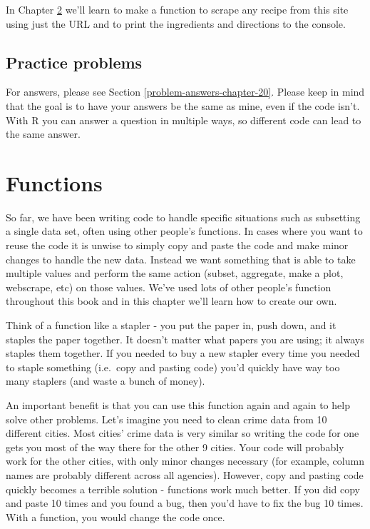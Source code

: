 \documentclass[
]{krantz}
\begin{document}
In Chapter \ref{functions} we'll learn to make a function to scrape any recipe from this site using just the URL and to print the ingredients and directions to the console.

\hypertarget{practice-problems-13}{%
\section{Practice problems}\label{practice-problems-13}}

For answers, please see Section \ref{problem-answers-chapter-20}. Please keep in mind that the goal is to have your answers be the same as mine, even if the code isn't. With R you can answer a question in multiple ways, so different code can lead to the same answer.

\hypertarget{functions}{%
\chapter{Functions}\label{functions}}

So far, we have been writing code to handle specific situations such as subsetting a single data set, often using other people's functions. In cases where you want to reuse the code it is unwise to simply copy and paste the code and make minor changes to handle the new data. Instead we want something that is able to take multiple values and perform the same action (subset, aggregate, make a plot, webscrape, etc) on those values. We've used lots of other people's function throughout this book and in this chapter we'll learn how to create our own.

Think of a function like a stapler - you put the paper in, push down, and it staples the paper together. It doesn't matter what papers you are using; it always staples them together. If you needed to buy a new stapler every time you needed to staple something (i.e.~copy and pasting code) you'd quickly have way too many staplers (and waste a bunch of money).

An important benefit is that you can use this function again and again to help solve other problems. Let's imagine you need to clean crime data from 10 different cities. Most cities' crime data is very similar so writing the code for one gets you most of the way there for the other 9 cities. Your code will probably work for the other cities, with only minor changes necessary (for example, column names are probably different across all agencies). However, copy and pasting code quickly becomes a terrible solution - functions work much better. If you did copy and paste 10 times and you found a bug, then you'd have to fix the bug 10 times. With a function, you would change the code once.
\end{document}
